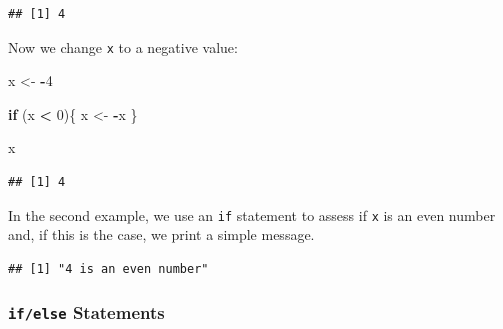 \documentclass[12pt,]{krantz}
\newenvironment{Shaded}{\begin{snugshade}}{\end{snugshade}}
\newcommand{\KeywordTok}[1]{\textcolor[rgb]{0.27,0.27,0.27}{\textbf{#1}}}
\newcommand{\DecValTok}[1]{\textcolor[rgb]{0.06,0.06,0.06}{#1}}
\newcommand{\StringTok}[1]{\textcolor[rgb]{0.5,0.5,0.5}{#1}}
\newcommand{\ControlFlowTok}[1]{\textcolor[rgb]{0.27,0.27,0.27}{\textbf{#1}}}
\newcommand{\OperatorTok}[1]{\textcolor[rgb]{0.43,0.43,0.43}{\textbf{#1}}}
\newcommand{\NormalTok}[1]{#1}
\begin{document}
\begin{verbatim}
## [1] 4
\end{verbatim}

Now we change \texttt{x} to a negative value:

\begin{Shaded}
\begin{Highlighting}[]
\NormalTok{x <-}\StringTok{ }\OperatorTok{-}\DecValTok{4}

\ControlFlowTok{if}\NormalTok{ (x }\OperatorTok{<}\StringTok{ }\DecValTok{0}\NormalTok{)\{}
\NormalTok{  x <-}\StringTok{ }\OperatorTok{-}\NormalTok{x}
\NormalTok{\}}

\NormalTok{x}
\end{Highlighting}
\end{Shaded}

\begin{verbatim}
## [1] 4
\end{verbatim}

In the second example, we use an \texttt{if} statement to assess if
\texttt{x} is an even number and, if this is the case, we print a simple
message.

\begin{Shaded}
\end{Shaded}

\begin{verbatim}
## [1] "4 is an even number"
\end{verbatim}

\begin{Shaded}
\end{Shaded}

\subsubsection{\texorpdfstring{\texttt{if/else}
Statements}{if/else Statements}}\label{ifelse-statements}
\end{document}
